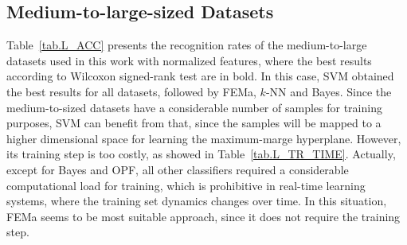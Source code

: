 
\subsection{Medium-to-large-sized Datasets}
\label{ss.medium_to_large}

Table~\ref{tab.L_ACC} presents the recognition rates of the medium-to-large datasets used in this work with normalized features, where the best results according to Wilcoxon signed-rank test are in bold. In this case, SVM obtained the best results for all datasets, followed by FEMa, $k$-NN and Bayes. Since the medium-to-sized datasets have a considerable number of samples for training purposes, SVM can benefit from that, since the samples will be mapped to a higher dimensional space for learning the maximum-marge hyperplane. However, its training step is too costly, as showed in Table~\ref{tab.L_TR_TIME}. Actually, except for Bayes and OPF, all other classifiers required a considerable computational load for training, which is prohibitive in real-time learning systems, where the training set dynamics changes over time. In this situation, FEMa seems to be most suitable approach, since it does not require the training step.

